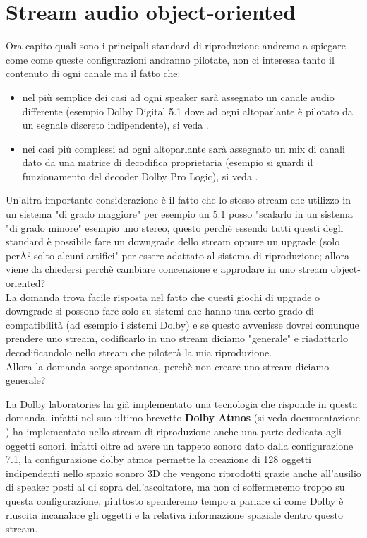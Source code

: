 \documentclass[12pt,a4paper]{report}
\begin{document}
\section{Stream audio object-oriented}

Ora capito quali sono i principali standard di riproduzione andremo a spiegare come come queste configurazioni andranno pilotate, non ci interessa tanto il contenuto di ogni canale ma il fatto che: 

\begin{itemize}
\item nel più semplice dei casi ad ogni speaker sarà assegnato un canale audio differente (esempio Dolby Digital 5.1 dove ad ogni altoparlante è pilotato da un segnale discreto indipendente), si veda \cite{digital}.
\item nei casi più complessi ad ogni altoparlante sarà assegnato un mix di canali dato da una matrice di decodifica proprietaria (esempio si guardi il funzionamento del decoder Dolby Pro Logic), si veda \cite{prologic}.
\end{itemize}

Un'altra importante considerazione è il fatto che lo stesso stream che utilizzo in un sistema "di grado maggiore" per esempio un 5.1 posso "scalarlo in un sistema "di grado minore" esempio uno stereo, questo perchè essendo tutti questi degli standard è possibile fare un downgrade dello stream oppure un upgrade (solo perÃ² solto alcuni artifici" per essere adattato al sistema di riproduzione; allora viene da chiedersi perchè cambiare concenzione e approdare in uno stream object-oriented?\\

La domanda trova facile risposta nel fatto che questi giochi di upgrade o downgrade si possono fare solo su sistemi che hanno una certo grado di compatibilità (ad esempio i sistemi Dolby) e se questo avvenisse dovrei comunque prendere uno stream, codificarlo in uno stream diciamo "generale" e riadattarlo decodificandolo nello stream che piloterà la mia riproduzione.\\

Allora la domanda sorge spontanea, perchè non creare uno stream diciamo generale?

La Dolby laboratories ha già implementato una tecnologia che risponde in questa domanda, infatti nel suo ultimo brevetto \textbf{Dolby Atmos} (si veda documentazione \cite{atmos}) ha implementato nello stream di riproduzione anche una parte dedicata agli oggetti sonori, infatti oltre ad avere un tappeto sonoro dato dalla configurazione 7.1, la configurazione dolby atmos permette la creazione di 128 oggetti indipendenti nello spazio sonoro 3D che vengono riprodotti grazie anche all'ausilio di speaker posti al di sopra dell'ascoltatore, ma non ci soffermeremo troppo su questa configurazione, piuttosto spenderemo tempo a parlare di come Dolby è riuscita incanalare gli oggetti e la relativa informazione spaziale dentro questo stream.\\
\end{document}
